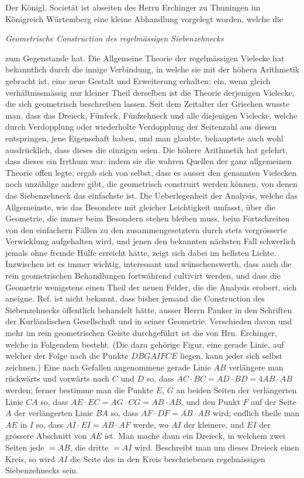 \documentclass[12pt]{article}
\begin{document}
Der Königl. Societät ist abseiten des Herrn Erchinger zu Thuningen im Königreich Würtemberg eine kleine Abhandlung vorgelegt worden, welche die
\begin{center}
\textit{Geometrische Construction des regelmässigen Siebenzehnecks}
\end{center}
zum Gegenstande hat. Die Allgemeine Theorie der regelmässigen Vielecke hat bekanntlich durch die innige Verbindung, in welche sie mit der höhern Arithmetik gebracht ist, eine neue Gestalt und Erweiterung erhalten; ein, wenn gleich verhältnissmässig nur kleiner Theil derselben ist die Theorie derjenigen Vielecke, die sich geometrisch beschreiben lassen. Seit dem Zeitalter der Griechen wusste man, dass das Dreieck, Fünfeck, Fünfzehneck und alle diejenigen Vielecke, welche durch Verdopplung oder wiederholte Verdopplung der Seitenzahl aus diesen entspringen, jene Eigenschaft haben, und man glaubte, behauptete auch wohl ausdrücklich, dass dieses die einzigen seien. Die höhere Arithmetik hat gelehrt, dass dieses ein Irrthum war: indem sie die wahren Quellen der ganz allgemeinen Theorie offen legte, ergab sich von selbst, dass es ausser den genannten Vielecken noch unzählige andere gibt, die geometrisch construirt werden können, von denen das Siebenzehneck das einfachste ist. Die Ueberlegenheit der Analysis, welche das Allgemeinste, wie das Besondere mit gleicher Leichtigkeit umfasst, über die Geometrie, die immer beim Besondern stehen bleiben muss, beim Fortschreiten von den einfachern Fällen zu den zusammengesetztern durch stets vergrösserte Verwicklung aufgehalten wird, und jenen den bekannten nächsten Fall schwerlich jemals ohne fremde Hülfe erreicht hätte, zeigt sich dabei im hellsten Lichte. Inzwischen ist es immer wichtig, interessant und wünschenswerth, dass auch die rein geometrischen Behandlungen fortwährend cultivirt werden, und dass die Geometrie wenigstens einen Theil der neuen Felder, die die Analysis erobert, sich aneigne. Ref. ist nicht bekannt, dass bisher jemand die Construction des Siebenzehnecks öffentlich behandelt hätte, ausser Herrn Pauker in den Schriften der Kurländischen Gesellschaft und in seiner Geometrie. Verschieden davon und mehr im rein geometrischen Geiste durchgeführt ist die von Hrn. Erchinger, welche in Folgendem besteht. (Die dazu gehörige Figur, eine gerade Linie, auf welcher der Folge nach die Punkte $D B G A I F C E$ liegen, kann jeder sich selbst zeichnen.) Eine nach Gefallen angenommene gerade Linie $AB$ verlängere man rückwärts und vorwärts nach $C$ und $D$ so, dass $AC\cdot BC=AD\cdot BD=4AB\cdot AB$ werden; ferner bestimme man die Punkte $E$, $G$ an beiden Seiten der verlängerten Linie $CA$ so, dass $AE\cdot EC=AG\cdot CG=AB\cdot AB$, und den Punkt $F$ auf der Seite $A$ der verlängerten Linie $BA$ so, dass $AF\cdot DF=AB\cdot AB$ wird; endlich theile man $AE$ in $I$ so, dass $AI\cdot EI=AB\cdot AF$ werde, wo $AI$ der kleinere, und $EI$ der grössere Abschnitt von $AE$ ist. Man mache dann ein Dreieck, in welchem zwei Seiten jede $=AB$, die dritte $=AI$ wird. Beschreibt man um dieses Dreieck einen Kreis, so wird $AI$ die Seite des in den Kreis beschriebenen regelmässigen Siebenzehnecks sein.
\end{document}
